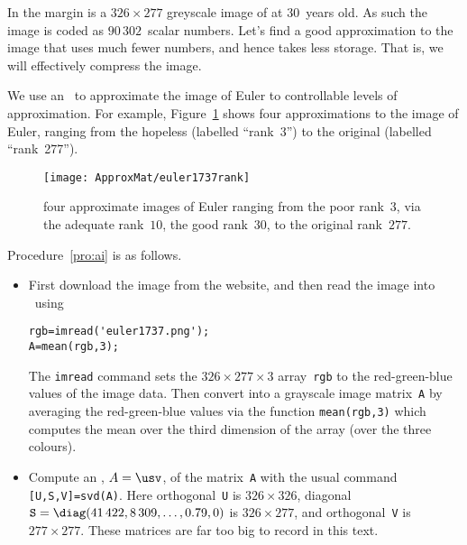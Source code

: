 \begin{example} \label{eg:euler1737}
In the margin is a \(326\times277\) greyscale image of  at 30~years old.  
As such the image is coded as \(90\,302\)~scalar numbers.
Let's find a good approximation to the image that uses much fewer numbers, and hence takes less storage.
That is, we will effectively compress the image.

\begin{solution} 
We use an \svd\ to approximate the image of Euler to controllable levels of approximation.
For example, Figure~\ref{fig:euler1737rank} shows four approximations to the image of Euler, ranging from the hopeless (labelled ``rank~3'')  to the original (labelled ``rank~277'').
\begin{figure}
\caption{four approximate images of Euler ranging from the poor rank~\(3\), via the adequate rank~\(10\), the good rank~\(30\), to the original rank~\(277\).}
\label{fig:euler1737rank}
\centering
\texttt{[image: ApproxMat/euler1737rank]}
\end{figure}

Procedure~\ref{pro:ai} is as follows.
\begin{itemize}
\item First download the image from the website, and then read the image into \script\ using 
\begin{verbatim}
rgb=imread('euler1737.png');
A=mean(rgb,3);
\end{verbatim}
The \verb|imread| command sets the \(326\times277\times3\) array~\verb|rgb| to the red-green-blue values of the image data. 
Then convert into a grayscale image matrix~\verb|A| by averaging the red-green-blue values via the function \verb|mean(rgb,3)| which computes the mean over the third dimension of the array (over the three colours).

\item Compute an \svd, \(A=\usv\), of the matrix~\verb|A| with the usual command \verb|[U,S,V]=svd(A)|.
Here orthogonal~\verb|U| is \(326\times326\), diagonal \(\verb|S|=\diag(41\,422, 8\,309,  \ldots,0.79,0)\) is \(326\times277\), and orthogonal~\verb|V| is \(277\times277\).
These matrices are far too big to record in this text.
\setbox\ajrqrbox\hbox{}%
\marginpar{\usebox{\ajrqrbox\\[2ex]}}%



\end{itemize}
\end{solution}
\end{example}
